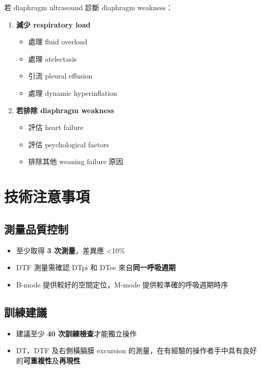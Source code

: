\documentclass[12pt,a4paper]{article}
\begin{document}
若 diaphragm ultrasound 診斷 diaphragm weakness：

\begin{enumerate}
    \item \textbf{減少 respiratory load}
    \begin{itemize}
        \item 處理 fluid overload
        \item 處理 atelectasis
        \item 引流 pleural effusion
        \item 處理 dynamic hyperinflation
    \end{itemize}

    \item \textbf{若排除 diaphragm weakness}
    \begin{itemize}
        \item 評估 heart failure
        \item 評估 psychological factors
        \item 排除其他 weaning failure 原因
    \end{itemize}
\end{enumerate}

\section{技術注意事項}

\subsection{測量品質控制}

\begin{itemize}
    \item 至少取得 \textbf{3 次測量}，差異應 <10\%
    \item DTF 測量需確認 DTpi 和 DTee 來自\textbf{同一呼吸週期}
    \item B-mode 提供較好的空間定位，M-mode 提供較準確的呼吸週期時序
\end{itemize}

\subsection{訓練建議}

\begin{itemize}
    \item 建議至少 \textbf{40 次訓練檢查}才能獨立操作
    \item DT、DTF 及右側橫膈膜 excursion 的測量，在有經驗的操作者手中具有良好的\textbf{可重複性}及\textbf{再現性}
\end{itemize}
\end{document}
